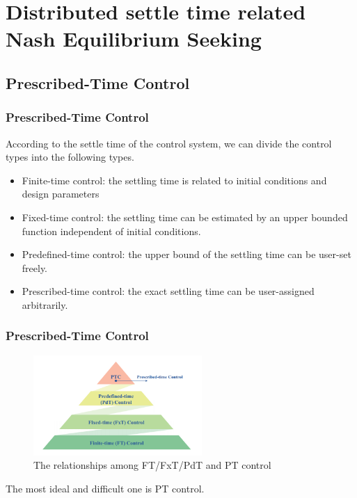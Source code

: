 \section[Distributed settle time related Nash Equilibrium Seeking]{Distributed settle time related Nash Equilibrium Seeking}\label{sec:4}

\subsection[Prescribed-Time Control]{Prescribed-Time Control}\label{subsec:4-1}
\begin{frame}
\frametitle{\normalsize{Prescribed-Time Control}}\transwipe
According to the settle time of the control system, we can divide the control types into the following types.
\begin{itemize}
    \item Finite-time control: the settling time is related to \textcolor[rgb]{0.00, 0.00, 1.00}{initial conditions}  and design parameters
     \vspace{6pt}
    \item Fixed-time control: the settling time can be estimated by an \textcolor[rgb]{0.00, 0.00, 1.00}{upper bounded} function independent of initial conditions.
    \vspace{6pt}
    \item Predefined-time control: the upper bound of the settling time can be \textcolor[rgb]{0.00, 0.00, 1.00}{user-set} freely.
    \vspace{6pt}
    \item Prescribed-time control: the exact settling time can be \textcolor[rgb]{0.00, 0.00, 1.00}{user-assigned arbitrarily}.
\end{itemize}
\end{frame}


\begin{frame}
\frametitle{\normalsize{Prescribed-Time Control}}\transwipe
\begin{figure}
  \includegraphics[height=1.5in]{figure/game/3-ptc.png}
  \vspace{6pt}
  \caption{The relationships among FT/FxT/PdT and PT control}
\end{figure}
\bremark
The most ideal and difficult one is PT control.
\eremark
\end{frame}

